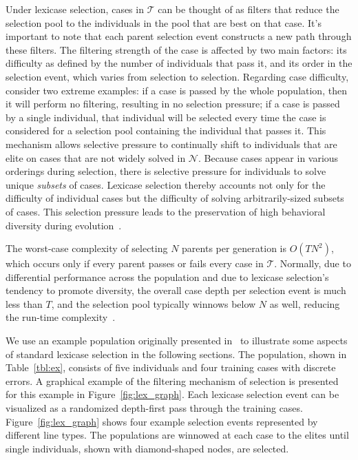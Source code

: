\documentclass[twoside]{article}
\begin{document}
Under lexicase selection, cases in $\mathcal{T}$ can be thought of as filters that reduce the selection pool to the individuals in the pool that are best on that case. It's important to note that each parent selection event constructs a new path through these filters. The filtering strength of the case is affected by two main factors: its difficulty as defined by the number of individuals that pass it, and its order in the selection event, which varies from selection to selection. Regarding case difficulty, consider two extreme examples: if a case is passed by the whole population, then it will perform no filtering, resulting in no selection pressure; if a case is passed by a single individual, that individual will be selected every time the case is considered for a selection pool containing the individual that passes it. This mechanism allows selective pressure to continually shift to individuals that are elite on cases that are not widely solved in $\mathcal{N}$. Because cases appear in various orderings during selection, there is selective pressure for individuals to solve unique {\it subsets} of cases. Lexicase selection thereby accounts not only for the difficulty of individual cases but the difficulty of solving arbitrarily-sized subsets of cases. This selection pressure leads to the preservation of high behavioral diversity during evolution~\citep{helmuth_solving_2014, la_cava_epsilon-lexicase_2016}. 

The worst-case complexity of selecting $N$ parents per generation is $O(TN^2)$, which occurs only if every parent passes or fails every case in $\mathcal{T}$. Normally, due to differential performance across the population and due to lexicase selection's tendency to promote diversity, the overall case depth per selection event is much less than $T$, and the selection pool typically winnows below $N$ as well, reducing the run-time complexity~\citep{helmuth_solving_2014,la_cava_epsilon-lexicase_2016}. 

We use an example population originally presented in~\citep{spector_assessment_2012} to illustrate some aspects of standard lexicase selection in the following sections. The population, shown in Table~\ref{tbl:ex}, consists of five individuals and four training cases with discrete errors. A graphical example of the filtering mechanism of selection is presented for this example in Figure~\ref{fig:lex_graph}. Each lexicase selection event can be visualized as a randomized depth-first pass through the training cases. Figure~\ref{fig:lex_graph} shows four example selection events represented by different line types. The populations are winnowed at each case to the elites until single individuals, shown with diamond-shaped nodes, are selected. 
\end{document}
